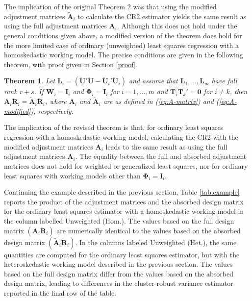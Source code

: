 \documentclass[12pt]{article}
\newtheorem*{thm}{Theorem}
\begin{document}
The implication of the original Theorem 2 was that using the modified
adjustment matrices \(\tilde{\mathbf{A}}_i\) to calculate the CR2
estimator yields the same result as using the full adjustment matrices
\(\mathbf{A}_i\). Although this does not hold under the general
conditions given above, a modified version of the theorem does hold for
the more limited case of ordinary (unweighted) least squares regression
with a homoskedastic working model. The precise conditions are given in
the following theorem, with proof given in Section \ref{proof}.

\begin{thm}
\label{thm:absorb}
Let $\mathbf{L}_i = \left(\mathbf{\ddot{U}}'\mathbf{\ddot{U}} - \mathbf{\ddot{U}}_i'\mathbf{\ddot{U}}_i\right)$ and assume that $\mathbf{L}_1,...,\mathbf{L}_m$ have full rank $r + s$. If $\mathbf{W}_i = \mathbf{I}_i$ and $\boldsymbol\Phi_i = \mathbf{I}_i$ for $i = 1,...,m$ and $\mathbf{T}_i \mathbf{T}_k' = \mathbf{0}$ for $i \neq k$, then $\mathbf{A}_i \mathbf{\ddot{R}}_i = \mathbf{\tilde{A}}_i \mathbf{\ddot{R}}_i$, where $\mathbf{A}_i$ and $\tilde{\mathbf{A}}_i$ are as defined in (\ref{eq:A-matrix}) and (\ref{eq:A-modified}), respectively.
\end{thm}

The implication of the revised theorem is that, for ordinary least
squares regression with a homoskedastic working model, calculating the
CR2 with the modified adjustment matrices \(\tilde{\mathbf{A}}_i\) leads
to the same result as using the full adjustment matrices
\(\mathbf{A}_i\). The equality between the full and absorbed adjustment
matrices does not hold for weighted or generalized least squares, nor
for ordinary least squares with working models other than
\(\boldsymbol\Phi_i = \mathbf{I}_i\).

Continuing the example described in the previous section, Table
\ref{tab:example} reports the product of the adjustment matrices and the
absorbed design matrix for the ordinary least squares estimator with a
homoskedastic working model in the column labelled Unweighted (Hom.).
The values based on the full design matrix
\(\left(\mathbf{A}_i \mathbf{\ddot{R}}_i\right)\) are numerically
identical to the values based on the absorbed design matrix
\(\left(\mathbf{\tilde{A}}_i \mathbf{\ddot{R}}_i\right)\). In the
columns labeled Unweighted (Het.), the same quantities are computed for
the ordinary least squares estimator, but with the heteroskedastic
working model described in the previous section. The values based on the
full design matrix differ from the values based on the absorbed design
matrix, leading to differences in the cluster-robust variance estimator
reported in the final row of the table.
\end{document}
